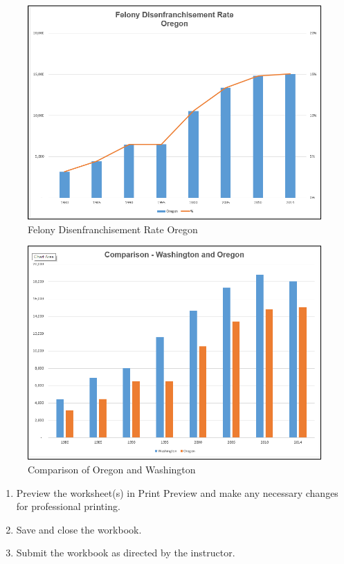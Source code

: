 \begin{figure}[H]
	\centering
	\includegraphics[width=\maxwidth{.95\linewidth}]{gfx/ch04_fig58}
	\caption{Felony Disenfranchisement Rate Oregon}
	\label{04:fig58}
\end{figure}

\begin{figure}[H]
	\centering
	\includegraphics[width=\maxwidth{.95\linewidth}]{gfx/ch04_fig59}
	\caption{Comparison of Oregon and Washington}
	\label{04:fig59}
\end{figure}


\begin{enumerate}
	\item Preview the worksheet(s) in Print Preview and make any necessary changes for professional printing.
	\item Save and close the  workbook. 
	\item Submit the  workbook as directed by the instructor.
\end{enumerate}